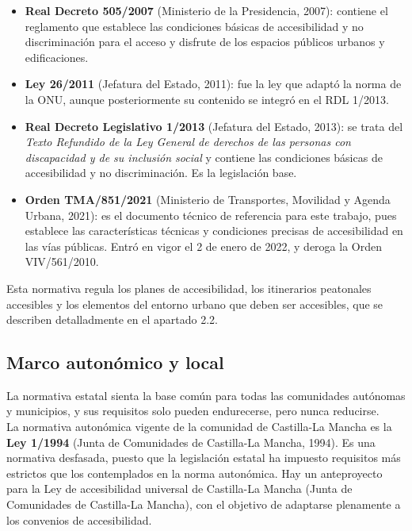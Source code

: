 \begin{itemize}
    \item \textbf{Real Decreto 505/2007} (Ministerio de la Presidencia, 2007): contiene el reglamento que establece las condiciones básicas de accesibilidad y no discriminación para el acceso y disfrute de los espacios públicos urbanos y edificaciones.
    \item \textbf{Ley 26/2011} (Jefatura del Estado, 2011): fue la ley que adaptó la norma de la ONU, aunque posteriormente su contenido se integró en el RDL 1/2013.
    \item \textbf{Real Decreto Legislativo 1/2013} (Jefatura del Estado, 2013): se trata del \textit{Texto Refundido de la Ley General de derechos de las personas con discapacidad y de su inclusión social} y contiene las condiciones básicas de accesibilidad y no discriminación. Es la legislación base.
    \item \textbf{Orden TMA/851/2021} (Ministerio de Transportes, Movilidad y Agenda Urbana, 2021): es el documento técnico de referencia para este trabajo, pues establece las características técnicas y condiciones precisas de accesibilidad en las vías públicas. Entró en vigor el 2 de enero de 2022, y deroga la Orden VIV/561/2010.
\end{itemize}

Esta normativa regula los planes de accesibilidad, los itinerarios peatonales accesibles y los elementos del entorno urbano que deben ser accesibles, que se describen detalladmente en el apartado 2.2.
\\

\subsection{Marco autonómico y local}
La normativa estatal sienta la base común para todas las comunidades autónomas y municipios, y sus requisitos solo pueden endurecerse, pero nunca reducirse.
\\

La normativa autonómica vigente de la comunidad de Castilla-La Mancha es la \textbf{Ley 1/1994} (Junta de Comunidades de Castilla-La Mancha, 1994). Es una normativa desfasada, puesto que la legislación estatal ha impuesto requisitos más estrictos que los contemplados en la norma autonómica. Hay un anteproyecto para la Ley de accesibilidad universal de Castilla-La Mancha (Junta de Comunidades de Castilla-La Mancha), con el objetivo de adaptarse plenamente a los convenios de accesibilidad.
\\

